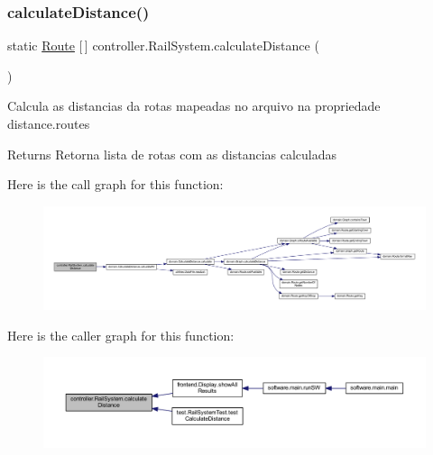 \subsubsection{\texorpdfstring{calculate\+Distance()}{calculateDistance()}}
{\footnotesize\ttfamily static \hyperlink{classdomain_1_1_route}{Route} \mbox{[}$\,$\mbox{]} controller.\+Rail\+System.\+calculate\+Distance (\begin{DoxyParamCaption}{ }\end{DoxyParamCaption})\hspace{0.3cm}{\ttfamily [static]}}

Calcula as distancias da rotas mapeadas no arquivo na propriedade \textquotesingle{}distance.\+routes\textquotesingle{}

\begin{DoxyReturn}{Returns}
Retorna lista de rotas com as distancias calculadas 
\end{DoxyReturn}
Here is the call graph for this function\+:\nopagebreak
\begin{figure}[H]
\begin{center}
\leavevmode
\includegraphics[width=350pt]{classcontroller_1_1_rail_system_ac9b98bc0b0a485cc9c4a85cc6814186e_cgraph}
\end{center}
\end{figure}
Here is the caller graph for this function\+:\nopagebreak
\begin{figure}[H]
\begin{center}
\leavevmode
\includegraphics[width=350pt]{classcontroller_1_1_rail_system_ac9b98bc0b0a485cc9c4a85cc6814186e_icgraph}
\end{center}
\end{figure}
\mbox{\label{classcontroller_1_1_rail_system_a03e61f5c81b49dfc59b0d3b7eefc1067}} 
